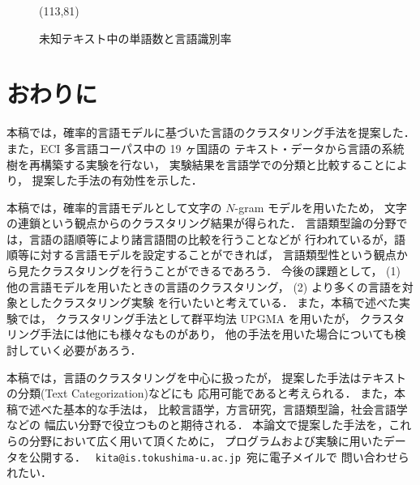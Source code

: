 \begin{figure}
\begin{center}
  \atari(113,81)
\end{center}
\caption{未知テキスト中の単語数と言語識別率}
\label{Fig:Rate}
\end{figure}

\section{おわりに}

本稿では，確率的言語モデルに基づいた言語のクラスタリング手法を提案した．
また，ECI 多言語コーパス中の 19 ヶ国語の
テキスト・データから言語の系統樹を再構築する実験を行ない，
実験結果を言語学での分類と比較することにより，
提案した手法の有効性を示した．

本稿では，確率的言語モデルとして文字の $N$-gram モデルを用いたため，
文字の連鎖という観点からのクラスタリング結果が得られた．
言語類型論の分野では，言語の語順等により諸言語間の比較を行うことなどが
行われているが，語順等に対する言語モデルを設定することができれば，
言語類型性という観点から見たクラスタリングを行うことができるであろう．
今後の課題として，
(1) 他の言語モデルを用いたときの言語のクラスタリング，
(2) より多くの言語を対象としたクラスタリング実験
を行いたいと考えている．
また，本稿で述べた実験では，
クラスタリング手法として群平均法 UPGMA を用いたが，
クラスタリング手法には他にも様々なものがあり，
他の手法を用いた場合についても検討していく必要があろう．

本稿では，言語のクラスタリングを中心に扱ったが，
提案した手法はテキストの分類(Text Categorization)などにも
応用可能であると考えられる．
また，本稿で述べた基本的な手法は，
比較言語学，方言研究，言語類型論，社会言語学などの
幅広い分野で役立つものと期待される．
本論文で提案した手法を，これらの分野において広く用いて頂くために，
プログラムおよび実験に用いたデータを公開する．
\verb+ kita@is.tokushima-u.ac.jp +宛に電子メイルで
問い合わせられたい．






\begin{biography}


\end{biography}


